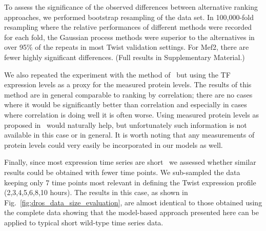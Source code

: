 \documentclass{pnastwo}
\begin{document}
\begin{article}
To assess the significance of the observed differences between
alternative ranking approaches, we performed bootstrap
resampling of the data set.  In 100,000-fold resampling where the
relative performances of different methods were recorded for each
fold, the Gaussian process methods were superior to the alternatives
in over 95\% of the repeats in most Twist validation settings.
For Mef2, there are fewer highly significant differences.
(Full results in Supplementary Material.)

We also repeated the experiment with the method of~\cite{Gatta2008}
but using the TF expression levels as a proxy for the measured protein
levels.  The results of this method are in general comparable to
ranking by correlation; there are no cases where it would be
significantly better than correlation and especially in cases where
correlation is doing well it is often worse.
Using measured protein levels as proposed in~\cite{Gatta2008} would
naturally help, but unfortunately such information is not available in
this case or in general.  It is worth noting that any measurements of
protein levels could very easily be incorporated in our models as well.

Finally, since most expression time series are short~\cite{Ernst2005}
we assessed whether similar results could be obtained with fewer time
points. We sub-sampled the data keeping only 7 time points most
relevant in defining the Twist expression profile
(2,3,4,5,6,8,10 hours). The results in this case, as shown in
Fig.~\ref{fig:dros_data_size_evaluation}, are almost identical to 
those obtained using the complete data showing that the model-based
approach presented here can be applied to typical short wild-type time
series data.


\end{article}
\end{document}
